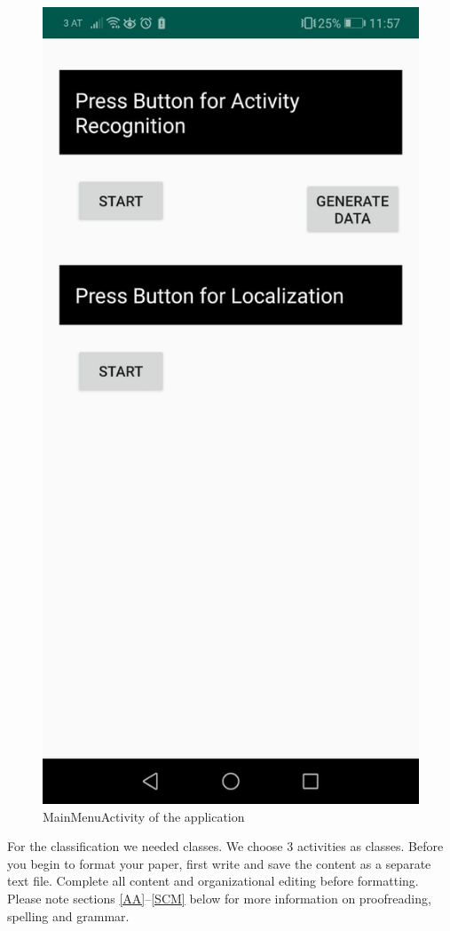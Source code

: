 \documentclass[conference]{IEEEtran}
\begin{document}
\begin{figure}
\includegraphics[scale=0.2]{MainActivity.jpeg}
\centering
\caption{MainMenuActivity of the application}
\label{fig:mainmenuactivity}
\end{figure}
For the classification we needed classes. We choose 3 activities as classes. 
Before you begin to format your paper, first write and save the content as a 
separate text file. Complete all content and organizational editing before 
formatting. Please note sections \ref{AA}--\ref{SCM} below for more information on 
proofreading, spelling and grammar.
\end{document}
